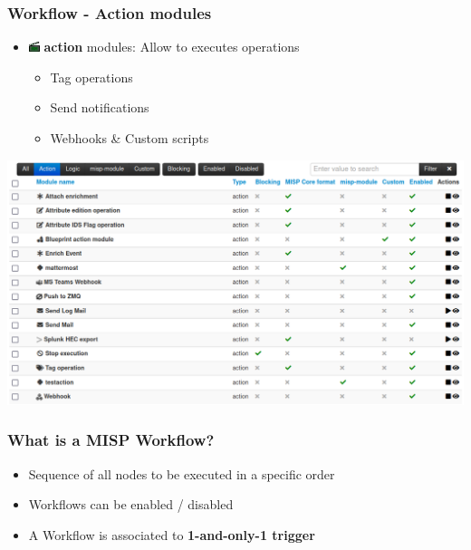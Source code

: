 \begin{frame}
    \frametitle{Workflow - Action modules}
    \begin{itemize}
        \item \includegraphics[width=12px]{pictures/sc-action-icon.png} \textbf{action} modules: Allow to executes operations
        \begin{itemize}
            \item Tag operations
            \item Send notifications
            \item Webhooks \& Custom scripts
        \end{itemize}
    \end{itemize}
    \begin{center}
        \includegraphics[width=0.95\linewidth]{pictures/action-module-index.png}
    \end{center}
\end{frame}

\begin{frame}
    \frametitle{What is a MISP Workflow?}
    \begin{itemize}
        \item Sequence of all nodes to be executed in a specific order
        \item Workflows can be enabled / disabled
        \item A Workflow is associated to \textbf{1-and-only-1 trigger}
    \end{itemize}
    \vspace*{0.5em}
    \begin{center}
    \end{center}
\end{frame}

